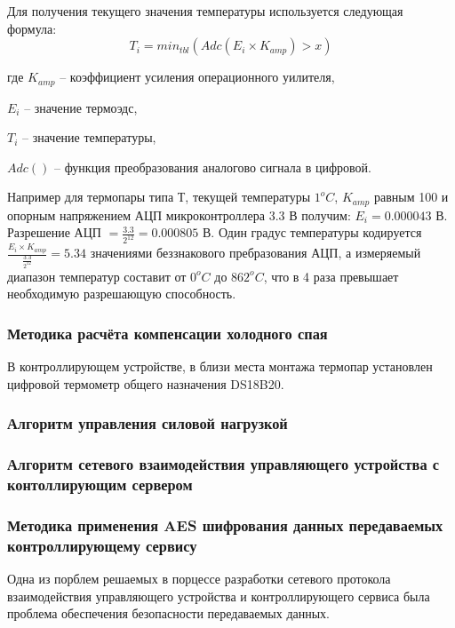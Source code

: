 Для получения текущего значения температуры используется следующая формула:
\begin{equation}
	T_i = min_{tbl}(Adc(E_i \times{} K_{amp}) > x) 
\end{equation}
\begin{ESKDexplanation}
	\item[где ]{} $K_{amp}$ -- коэффициент усиления операционного уилителя,
	\item{} $E_i$ -- значение термоэдс,
	\item{} $T_i$ -- значение температуры,
	\item{} $Adc()$ -- функция преобразования аналогово сигнала в цифровой.
\end{ESKDexplanation}


Например для термопары типа Т, текущей температуры $1^oC$, $K_{amp}$ равным 100 и опорным напряжением
АЦП микроконтроллера 3.3 В получим:
$E_i = 0.000043$ В. Разрешение АЦП $= \frac{3.3}{2^{12}} = 0.000805$ В. Один градус температуры
кодируется $\frac{E_i \times{} K_{amp}}{\frac{3.3}{2^{12}}} = 5.34 $ значениями
беззнакового пребразования АЦП, а измеряемый диапазон температур составит от $0^oC$ до $862^oC$,
что в 4 раза превышает необходимую разрешающую способность.

\subsubsection{Методика расчёта компенсации холодного спая}
В контроллирующем устройстве, в близи места монтажа термопар
установлен цифровой термометр общего назначения DS18B20.



\subsubsection{Алгоритм управления силовой нагрузкой}

\subsubsection{Алгоритм сетевого взаимодействия управляющего устройства
с контоллирующим сервером}

\subsubsection{Методика применения AES шифрования данных передаваемых
контроллирующему сервису}
Одна из порблем решаемых в порцессе разработки сетевого протокола 
взаимодействия управляющего устройства и контроллирующего сервиса
была проблема обеспечения безопасности передаваемых данных.


